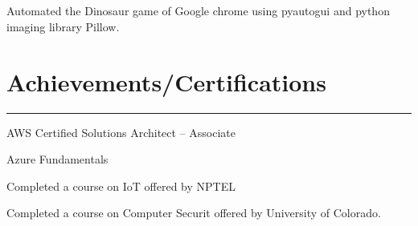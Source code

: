 \documentclass[]{../../rahulworld-resume}
\begin{document}
\begin{minipage}[t]{0.57\textwidth}
\datecolor{}  
\noindent
\hspace{5em}%
\begin{minipage}{1\textwidth\vspace{2pt}}
\runsubsection{[Python]}\\\\
Automated the Dinosaur game of Google chrome using pyautogui and python imaging library Pillow.
\end{minipage}
\section{Achievements/Certifications} 
\noindent\rule{11cm}{0.4pt}
 
\noindent
\hspace{5em}%
\begin{minipage}{0.85\textwidth\vspace{2pt}}
 AWS Certified Solutions Architect – Associate
\end{minipage}
 
\noindent
\hspace{5em}%
\begin{minipage}{0.85\textwidth\vspace{2pt}}
\runsubsection{}
 Azure Fundamentals
\end{minipage}
 
\noindent
\hspace{5em}%
\begin{minipage}{0.85\textwidth\vspace{2pt}}
Completed a course on IoT offered by NPTEL
\end{minipage}
 
\noindent
\hspace{5em}%
\begin{minipage}{0.85\textwidth\vspace{2pt}}
Completed a course on Computer Securit offered by University of Colorado.
\end{minipage}

\end{minipage}
\end{document}

